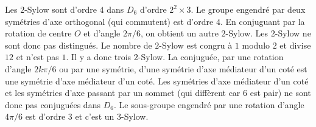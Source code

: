 {\begin{enumerate}
{Les $2$-Sylow sont d'ordre $4$ dans $D_{6}$ d'ordre $2^2\times 3$.
 Le groupe engendré par deux symétries d'axe orthogonal (qui commutent) est d'ordre $4$. En conjuguant par la rotation de centre $O$ et d'angle $2\pi/6$, on obtient un autre $2$-Sylow.
 Les $2$-Sylow ne sont donc pas distingués. Le nombre de $2$-Sylow est congru à $1$ modulo $2$ et divise $12$ et n'est pas $1$.
 Il y a donc trois $2$-Sylow.
La conjuguée, par une rotation d'angle $2k\pi/6$ ou par une symétrie, d'une symétrie d'axe médiateur d'un coté est une symétrie d'axe médiateur d'un coté. 
 Les symétries d'axe médiateur d'un coté et les symétries d'axe passant par un sommet (qui diffèrent car $6$ est pair) ne sont donc pas conjuguées dans $D_{6}$.
Le sous-groupe engendré par une rotation d'angle $4\pi/6$ est d'ordre $3$ et c'est un $3$-Sylow.
}
\end{enumerate}
}
